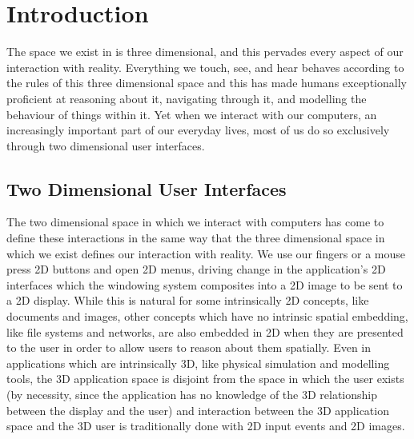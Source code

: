 \chapter{Introduction}
The space we exist in is three dimensional, and this pervades every aspect of our interaction with reality. Everything we touch, see, and hear behaves according to the rules of this three dimensional space and this has made humans exceptionally proficient at reasoning about it, navigating through it, and modelling the behaviour of things within it. Yet when we interact with our computers, an increasingly important part of our everyday lives, most of us do so exclusively through two dimensional user interfaces. 
 
\section{Two Dimensional User Interfaces}

The two dimensional space in which we interact with computers has come to define these interactions in the same way that the three dimensional space in which we exist defines our interaction with reality. We use our fingers or a mouse press 2D buttons and open 2D menus, driving change in the application’s 2D interfaces which the windowing system composites into a 2D image to be sent to a 2D display. While this is natural for some intrinsically 2D concepts, like documents and images, other concepts which have no intrinsic spatial embedding, like file systems and networks, are also embedded in 2D when they are presented to the user in order to allow users to reason about them spatially. Even in applications which are intrinsically 3D, like physical simulation and modelling tools, the 3D application space is disjoint from the space in which the user exists (by necessity, since the application has no knowledge of the 3D relationship between the display and the user) and interaction between the 3D application space and the 3D user is traditionally done with 2D input events and 2D images.  
	
